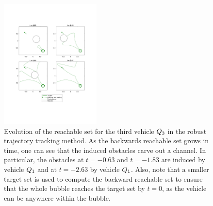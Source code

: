\begin{figure}[h]
  \centering
  \includegraphics[width=0.45\textwidth]{"fig/rtt_rs3"}
  \caption{Evolution of the reachable set for the third vehicle $Q_3$ in the robust trajectory tracking method. As the backwards reachable set grows in time, one can see that the induced obstacles carve out a channel. In particular, the obstacles at $t =-0.63$ and $t=-1.83$ are induced by vehicle $Q_1$ and at $t =-2.63$ by vehicle $Q_1$. Also, note that a smaller target set is used to compute the backward reachable set to ensure that the whole bubble reaches the target set by $t=0$, as the vehicle can be anywhere within the bubble.}
  \label{fig:rtt_rs3}
\end{figure}